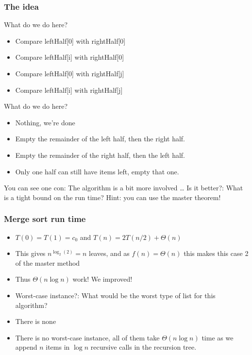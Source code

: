 \begin{frame}[fragile]
	\frametitle{The idea}

		
			What do we do here?
				\begin{itemize}
					\item Compare leftHalf[0] with rightHalf[0]
					\item Compare leftHalf[i] with rightHalf[0]
					\item Compare leftHalf[0] with rightHalf[j]
					\item Compare leftHalf[i] with rightHalf[j]
				\end{itemize}
				What do we do here?
				\begin{itemize}
					\item Nothing, we're done
					\item Empty the remainder of the left half, then the right half.
					\item Empty the remainder of the right half, then the left half.
					\item Only one half can still have items left, empty that one.
				\end{itemize}
				You can see one con:		The algorithm is a bit more involved \ldots
				Is it better?: What is a tight bound on the run time?	Hint: you can use the master theorem!
\end{frame}

\begin{frame}
	\frametitle{Merge sort run time}
				\begin{itemize}
					\item $T(0) = T(1) = c_0$ and $T(n) = 2T(n/2) + \Theta(n)$
					\item This gives $n^{\log_2(2)} = n$ leaves, and as $f(n) = \Theta(n)$ this makes this case 2 of the master method
					\item Thus $\Theta(n\log n)$ work! We improved!
					\item Worst-case instance?:
		What would be the worst type of list for this algorithm?
	
					\item There is none
					\item There is no worst-case instance, all of them take $\Theta(n \log n)$ time as we append $n$ items in $\log n$
		recursive calls in the recursion tree.
	\end{itemize}
\end{frame}

